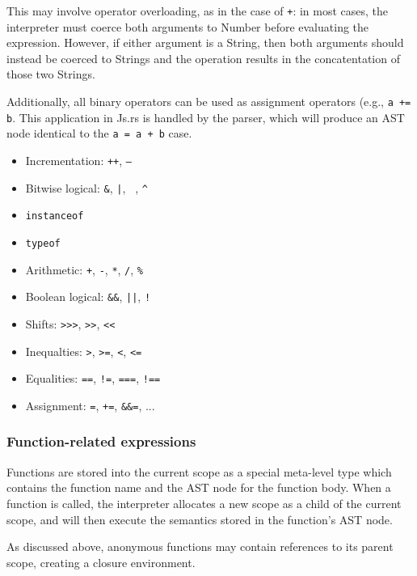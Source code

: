 \documentclass{article}
\begin{document}
\begin{multicols}{2}
This may involve operator overloading, as in the case of \texttt{+}: in most cases, the
interpreter must coerce both arguments to Number before evaluating the
expression. However, if either argument is a String, then both
arguments should instead be coerced to Strings and the operation results in the
concatentation of those two Strings. \newline

Additionally, all binary operators can be used as assignment operators (e.g.,
\texttt{a += b}. This application in Js.rs is handled by the parser, which will
produce an AST node identical to the \texttt{a = a + b} case.

\begin{itemize}
  \item Incrementation: \texttt{++}, \texttt{--}
  \item Bitwise logical: \texttt{\&}, \texttt{|}, \texttt{~}, \texttt{\^}
  \item \texttt{instanceof}
  \item \texttt{typeof}
  \item Arithmetic: \texttt{+}, \texttt{-}, \texttt{*}, \texttt{/}, \texttt{\%}
  \item Boolean logical: \texttt{\&\&}, \texttt{||}, \texttt{!}
  \item Shifts: \texttt{>>>}, \texttt{>>}, \texttt{<<}
  \item Inequalties: \texttt{>}, \texttt{>=}, \texttt{<}, \texttt{<=}
  \item Equalities: \texttt{==}, \texttt{!=}, \texttt{===}, \texttt{!==}
  \item Assignment: \texttt{=}, \texttt{+=}, \texttt{\&\&=}, ...
\end{itemize}

\subsubsection*{Function-related expressions}

Functions are stored into the current scope as a special meta-level type which
contains the function name and the AST node for the function body. When a
function is called, the interpreter allocates a new scope as a child of the
current scope, and will then execute the semantics stored in the function's
AST node. \newline

As discussed above, anonymous functions may contain references to its parent
scope, creating a closure environment.


\end{multicols}
\end{document}
